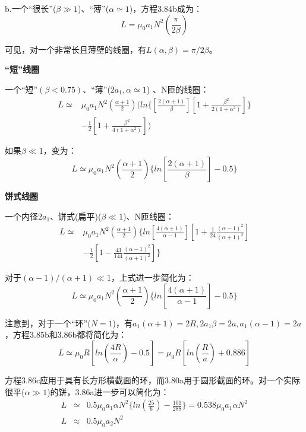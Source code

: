 b.一个“很长”($\beta\gg 1$)、“薄”($\alpha \simeq 1$)，方程3.84b成为：
\begin{equation}
  L=\mu_0a_1N^2(\frac{\pi}{2\beta})%
\end{equation}

可见，对一个非常长且薄壁的线圈，有$L(\alpha,\beta)=\pi/2\beta$。

\textbf{“短”线圈}

 一个“短”$(\beta<0.75)$、“薄”($2a_1,\alpha\simeq 1$) 、N匝的线圈：
  \begin{equation}
  \begin{split}
L\simeq&\mu_0a_1N^2(\frac{\alpha+1}{2})(ln\{[\frac{2(\alpha+1)}{\beta}][1+\frac{\beta^2}{2(1+\alpha^2)}]\}\\
&-\frac{1}{2}[1+\frac{\beta^2}{4(1+\alpha^2)}])%
  \end{split}
  \end{equation}
  
  如果$\beta \ll 1$，变为：
  \begin{equation}
L\simeq\mu_0a_1N^2(\frac{\alpha+1}{2})\{ln[\frac{2(\alpha+1)}{\beta}]-0.5\}%
\end{equation}

\textbf{饼式线圈}

  一个内径$2a_1$、饼式(扁平)($\beta\ll 1$)、N匝线圈：
  \begin{equation}
  \begin{split}
L\simeq & \mu_0a_1N^2(\frac{\alpha+1}{2})\{ln[\frac{4(\alpha+1)}{\alpha-1}][1+\frac{1}{24}\frac{(\alpha-1)^2}{(\alpha+1)^2}]\\
&-\frac{1}{2}[1-\frac{43}{144}\frac{(\alpha-1)^2}{(\alpha+1)^2}]\}%
  \end{split}
\end{equation}

对于$(\alpha-1)/(\alpha+1)\ll 1$，上式进一步简化为：
\begin{equation}
L\simeq\mu_0a_1N^2(\frac{\alpha+1}{2})\{ln[\frac{4(\alpha+1)}{\alpha-1}]-0.5\}%
\end{equation}

注意到，对于一个“环”($N=1$)，有$a_1(\alpha+1)=2R,2a_1\beta=2a,a_1(\alpha-1)=2a$，方程3.85b和3.86b都将简化为：
\begin{equation}
L\simeq\mu_0R[ln(\frac{4R}{\alpha})-0.5]=\mu_0R[ln(\frac{R}{a})+0.886]%
\end{equation}

方程3.86c应用于具有长方形横截面的环，而3.80a用于圆形截面的环。对一个实际很平($\alpha\gg 1$)的饼，3.86a进一步可以简化为：
\begin{eqnarray}
L & \simeq & 0.5\mu_0a_1\alpha N^2\{ln(\frac{25}{6})-\frac{101}{288}\}=0.538\mu_0a_1\alpha N^2\\%
L & \approx &0.5\mu_0a_2N^2%
\end{eqnarray}

